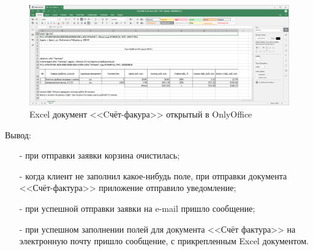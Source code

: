 \begin{figure}[!htb]\centering

    \includegraphics[width=14.5cm]
    {images/mobile/order/order-email-4.png}

    \caption{Excel документ <<Cчёт-факура>> открытый в OnlyOffice}
    \label{fig:test_order_excel}
\end{figure}

Вывод:

\begin{itemize}
    \item[-] при отправки заявки корзина очистилась;
    \item[-] когда клиент не заполнил какое-нибудь поле, при отправки документа <<Счёт-фактура>>
    приложение отправило уведомление;
    \item[-] при успешной отправки заявки на e-mail пришло сообщение;
    \item[-] при успешном заполнении полей для документа <<Счёт фактура>> на электронную почту пришло сообщение,
    с прикрепленным Excel документом.
\end{itemize}
